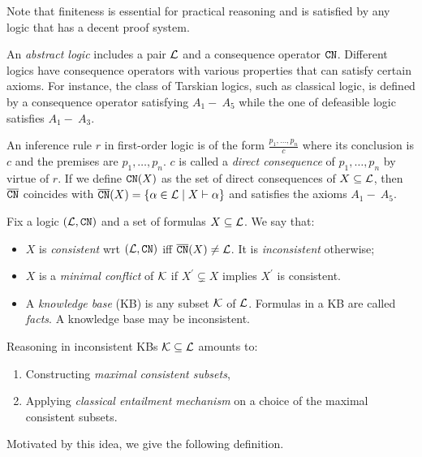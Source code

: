 Note that finiteness is essential for practical reasoning and is satisfied by any logic that has a decent proof system.

An \emph{abstract logic} includes a pair $\mathcal{L}$ and a consequence operator $\texttt{\textup{CN}}$. Different logics have consequence operators with various properties that can satisfy certain axioms. For instance, the class of Tarskian logics, such as classical logic, is defined by a consequence operator satisfying $A_1 -\ A_5$ while the one of defeasible logic satisfies $A_1 -\ A_3$. 




\begin{example} An inference rule $r$ in first-order logic is of the form $\frac{ p_1, \ldots, p_n}{c}$ where its conclusion is $c$ and the premises are $p_1, \ldots, p_n$. $c$ is called a \emph{direct consequence} of $p_1, \ldots, p_n$ by virtue of $r$. If we define $\texttt{\textup{CN}}(X)$ as the set of direct consequences of $X \subseteq \mathcal{L}$, then $\overline{\texttt{\textup{CN}}}$ coincides with
$\overline{\texttt{\textup{CN}}}(X) = \{ \alpha \in \mathcal{L} \mid X \vdash \alpha \}$ and
satisfies the axioms $A_1 -\ A_5$.
\end{example}

 Fix a logic $(\mathcal{L}, \texttt{\textup{CN}})$ and a set of formulas $X \subseteq \mathcal{L}$. We say that:
\begin{itemize} 
    \item $X$ is \textit{consistent} wrt $(\mathcal{L}, \texttt{\textup{CN}})$ iff $\overline{\texttt{\textup{CN}}}(X) \neq \mathcal{L}$. It is \textit{inconsistent} otherwise;   
     \item $X$ is a \textit{minimal conflict} of $\mathcal{K}$ if $X^{\prime}  \subsetneq X$ implies  $X^{\prime}$ is consistent.
    \item A \textit{knowledge base} (KB) is any subset $\mathcal{K}$ of $\mathcal{L}$. Formulas in a KB are called \emph{facts}. A knowledge base may be inconsistent. %
   
\end{itemize}

Reasoning in inconsistent KBs $\mathcal{K} \subseteq \mathcal{L}$ amounts to:
\begin{enumerate}
    \item Constructing \emph{maximal consistent subsets},
    \item Applying \emph{classical entailment mechanism} on a choice of the maximal consistent subsets. 
\end{enumerate}
Motivated by this idea, we give the following definition.

